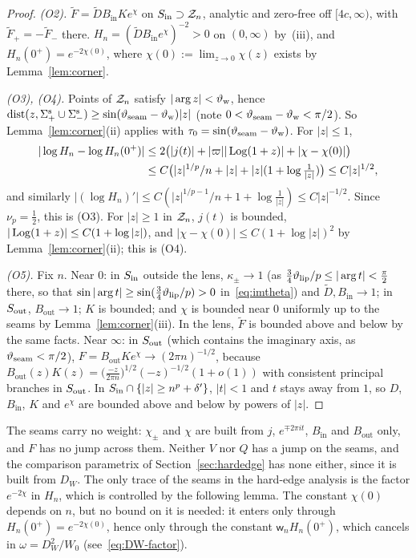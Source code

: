 \begin{proof}
\emph{(O2).} $\tilde F=\tilde DB_{\mathrm{in}}Ke^\chi$ on $S_{\mathrm{in}}\supset\mathcal{Z}_n$, analytic and zero-free off $[4c,\infty)$, with
$\tilde F_+=-\tilde F_-$ there. $H_n=(\tilde DB_{\mathrm{in}}e^{\chi})^{-2}>0$ on $(0,\infty)$ by~(iii), and
$H_n(0^+)=e^{-2\chi(0)}$, where $\chi(0):=\lim_{z\to0}\chi(z)$ exists by Lemma~\ref{lem:corner}.

\emph{(O3), (O4).} Points of $\mathcal{Z}_n$ satisfy $|\arg z|<\vartheta_{\mathrm{w}}$, hence $\mathrm{dist}(z,\Sigma^{\mathrm{s}}_+\cup\Sigma^{\mathrm{s}}_-)\ge\sin(\vartheta_{\mathrm{seam}}-\vartheta_{\mathrm{w}})|z|$
(note $0<\vartheta_{\mathrm{seam}}-\vartheta_{\mathrm{w}}<\pi/2$). So Lemma~\ref{lem:corner}(ii) applies with $\tau_0=\sin(\vartheta_{\mathrm{seam}}-\vartheta_{\mathrm{w}})$. For $|z|\le1$,
\begin{align*}
  |\log H_n-\log H_n(0^+)|&\le2\bigl(|j(t)|+|\varpi||\operatorname{Log}(1+z)|+|\chi-\chi(0)|\bigr)\\
  &\le C\bigl(|z|^{1/p}/n+|z|+|z|(1+\log\tfrac1{|z|})\bigr)\le C|z|^{1/2},
\end{align*}
and similarly $|(\log H_n)'|\le C(|z|^{1/p-1}/n+1+\log\frac1{|z|})\le C|z|^{-1/2}$. Since $\nu_p=\frac12$, this is (O3). For
$|z|\ge1$ in $\mathcal{Z}_n$, $j(t)$ is bounded, $|\operatorname{Log}(1+z)|\le C(1+\log|z|)$, and $|\chi-\chi(0)|\le C(1+\log|z|)^2$ by
Lemma~\ref{lem:corner}(ii); this is (O4).

\emph{(O5).} Fix $n$. Near $0$: in $S_{\mathrm{in}}$ outside the lens, $\kappa_\pm\to1$ (as $\frac34\vartheta_{\mathrm{lip}}/p\le|\arg t|<\frac\pi2$ there, so that
$\sin|\arg t|\ge\sin(\frac34\vartheta_{\mathrm{lip}}/p)>0$ in~\eqref{eq:imtheta}) and $\tilde D,B_{\mathrm{in}}\to1$; in $S_{\mathrm{out}}$, $B_{\mathrm{out}}\to1$; $K$ is bounded; and $\chi$ is
bounded near $0$ uniformly up to the seams by Lemma~\ref{lem:corner}(iii). In the lens, $\tilde F$ is bounded above and
below by the same facts. Near $\infty$: in $S_{\mathrm{out}}$ (which contains the imaginary axis, as $\vartheta_{\mathrm{seam}}<\pi/2$),
$F=B_{\mathrm{out}}Ke^\chi\to(2\pi n)^{-1/2}$, because $B_{\mathrm{out}}(z)K(z)=\bigl(\frac{-z}{2\pi n}\bigr)^{1/2}(-z)^{-1/2}(1+o(1))$
with consistent principal branches in $S_{\mathrm{out}}$. In $S_{\mathrm{in}}\cap\{|z|\ge n^p+\delta'\}$, $|t|<1$ and $t$ stays away from $1$, so
$D$, $B_{\mathrm{in}}$, $K$ and $e^\chi$ are bounded above and below by powers of $|z|$.
\end{proof}

The seams carry no weight: $\chi_\pm$ and $\chi$ are built from $j$, $e^{\mp2\pi it}$, $B_{\mathrm{in}}$ and
$B_{\mathrm{out}}$ only, and $F$ has no jump across them. Neither $V$ nor $Q$ has a jump on the seams, and the
comparison parametrix of Section~\ref{sec:hardedge} has none either, since it is built from $D_W$. The only trace of the
seams in the hard-edge analysis is the factor $e^{-2\chi}$ in $H_n$, which is controlled by the following lemma. The
constant $\chi(0)$ depends on $n$, but no bound on it is needed: it enters only through $H_n(0^+)=e^{-2\chi(0)}$, hence
only through the constant $\mathsf w_nH_n(0^+)$, which cancels in $\omega=D_W^2/W_0$ (see~\eqref{eq:DW-factor}).

